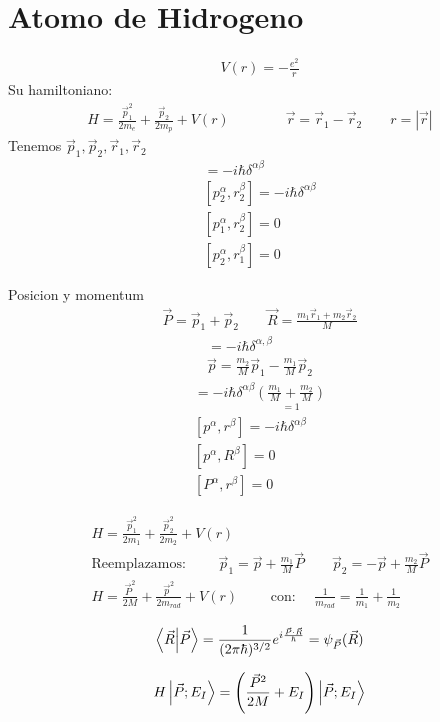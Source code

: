 \documentclass{article}
\begin{document}
\section{Atomo de Hidrogeno } 
\begin{gather*}
  V(r) = -\frac{e^2 }{r } 
\end{gather*}
Su hamiltoniano: 
\begin{gather*}
  H = \frac{\vec p_1 ^2}{2m_e } + \frac{\vec p _2}{2m_p} + V(r) \qquad \qquad \vec r = \vec r_1 - \vec r_2 \qquad r = \left|\vec r \right|
\end{gather*}
Tenemos $ \vec p_1, \vec p_2, \vec r_1, \vec r_2  $
\begin{gather*}
  [p_1^\alpha, r_1^\beta] = -i \hbar  \delta ^ {\alpha \beta }\\
  [p_2^\alpha, r_2^\beta] = -i \hbar  \delta ^ {\alpha \beta }\\
  [p_1^\alpha, r_2^\beta] = 0 \\
  [p_2^\alpha, r_1^\beta] = 0 
\end{gather*}

Posicion y momentum 
\begin{gather*}
  \vec P = \vec p _1 + \vec p _2\qquad  
  \vec R = \frac{m_1 \vec r_1 + m_2 \vec r_2 }{M } 
\end{gather*}
\begin{gather*}
  [p ^ {\alpha }, r ^ {\beta }] = -i \hbar \delta ^ {\alpha, \beta }\\
  \vec p = \frac{m_2 }{M } \vec p _1 - \frac{m_1 }{M } \vec p _2  
\end{gather*}
\begin{gather*}
  [P ^ {\alpha }, R ^ {\beta }] = - i \hbar  \delta ^ {\alpha\beta} \underset{=1 }{\left(\frac{m_1 }{M } + \frac{m_2 }{M }\right) }\\
  [p ^ {\alpha}, r ^ {\beta}] = - i \hbar \delta ^ {\alpha\beta}\\
  [p ^ {\alpha }, R ^ {\beta }] = 0 \\
  [P ^ {\alpha}, r ^ {\beta}] = 0 
\end{gather*}

\hfill 

\begin{gather*}
  H = \frac{\vec p_1 ^ {2 }}{2m_1 }  + \frac{\vec p_2 ^2 }{2m_2 } + V(r)\\
  \text{Reemplazamos: }\qquad 
  \vec p_1 = \vec p + \frac{m_1 }{M }\vec P \qquad 
  \vec p_2 = -\vec p + \frac{m_2 }{M } \vec P \\
  H = \frac{\vec P ^2}{2M } + \frac{\vec p ^2}{2m _{rad } } + V(r) \qquad \text{ con: }\quad \frac{1}{m _{rad } } = \frac{1}{m_1 } + \frac{1}{m_2 }
\end{gather*}

\begin{gather*}
  \bra{\vec R }\ket{\vec P } = \frac{1}{(2\pi \hbar ) ^ {3/2 }} e ^ {i \frac{\vec P \cdot \vec R }{\hbar }} = \psi _{\vec P } (\vec R ) 
\end{gather*}

\begin{gather*}
  H \ket{\vec P ; E_I  }  = \left(\frac{\vec P ^2}{2M } + E_I \right)\ket{\vec P;E_I }
\end{gather*}
\end{document}
